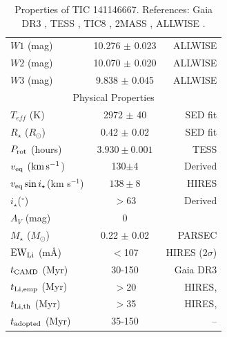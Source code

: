 \documentclass{nature3}
\newcommand{\starname}{TIC 141146667}
\newcommand{\kms}{\ensuremath{\rm km\,s^{-1}}}
\begin{document}
\begin{methods}
\begin{table}
\begin{tabular}{lcr}
    $W1$ (mag)                      & 10.276 $\pm$ 0.023 & ALLWISE   \\ %
    $W2$ (mag)                      & 10.070 $\pm$ 0.020 & ALLWISE   \\
    $W3$ (mag)                      &  9.838 $\pm$ 0.045 & ALLWISE   \\
    \hline
    \multicolumn{3}{c}{Physical Properties} \\
    \hline
    $T_{eff}$ (K) & 2972 $\pm$ 40 & \cite{Bouma2024} SED fit\\
    $R_\star$ ($R_{\odot}$) & 0.42 $\pm$ 0.02 & \cite{Bouma2024} SED fit \\
    $P_{\rm rot}$ (hours) & $3.930\pm 0.001$ & TESS \\ 
    $v_{\rm eq}$ (\kms)  &  130$\pm$4  & Derived \\
    $v_{\rm eq} \sin i_\star$(km s$^{-1}$) & $138 \pm 8$ & HIRES \\
    $i_\star$($^\circ$) & $>$63 & Derived \\
    $A_V$ (mag) & 0 & \cite{Green2019} \\
    $M_\star$ ($M_{\odot}$)  & 0.22 $\pm$ 0.02  & PARSEC \cite{Chen2014}\\
    ${\rm EW}_{\rm Li}$ (m\AA) & $<$107 & HIRES (2$\sigma$)\\
    $t_{\rm CAMD}$ (Myr) & 30-150 &  Gaia DR3 \\
    $t_{\rm Li,emp}$ (Myr) & $>$20 &  HIRES, \cite{Jeffries2023} \\
    $t_{\rm Li,th}$ (Myr) & $>$35 &  HIRES, \cite{Feiden2016} \\
    $t_{\rm adopted}$ (Myr) & 35-150 &  -- \\
    \hline
    \end{tabular}
		\caption{Properties of \starname.  References:
    Gaia DR3 \cite{GaiaDR3}, TESS \cite{Ricker2015},
    TIC8 \cite{Stassun2019}, 2MASS \cite{Skrutskie2006}, ALLWISE
    \cite{Cutri2014}.}
    \label{tab:stparams}
\end{table}



\end{methods}
\end{document}
